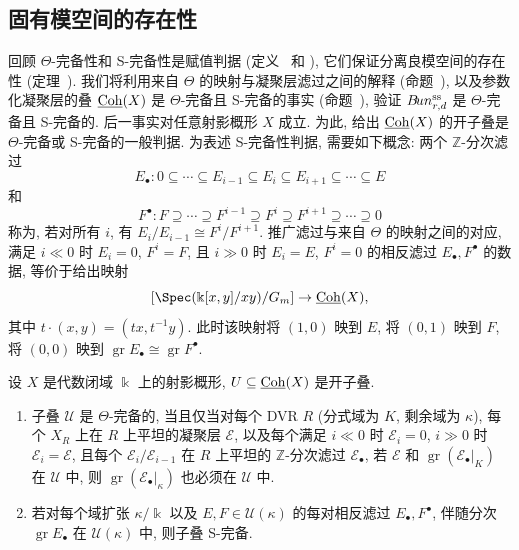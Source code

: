 \subsection{固有模空间的存在性}\label{src:9.3.2-subsection}
回顾 $\Theta$-完备性和 S-完备性是赋值判据 (定义~ 和 ), 它们保证分离良模空间的存在性 (定理~). 我们将利用来自 $\Theta$ 的映射与凝聚层滤过之间的解释 (命题~), 以及参数化凝聚层的叠 $\underline{\mathrm{Coh}}(X)$ 是 $\Theta$-完备且 S-完备的事实 (命题~), 验证 $B\!un_{r,d}^{\mathrm{ss}}$ 是 $\Theta$-完备且 S-完备的. 后一事实对任意射影概形 $X$ 成立. 为此, 给出 $\underline{\mathrm{Coh}}(X)$ 的开子叠是 $\Theta$-完备或 S-完备的一般判据. 为表述 S-完备性判据, 需要如下概念: 两个 $\mathbb Z$-分次滤过
\[
E_\bullet:0\subseteq\cdots\subseteq E_{i-1}\subseteq E_i\subseteq E_{i+1}\subseteq\cdots\subseteq E
\]
和
\[
F^\bullet:F\supseteq\cdots\supseteq F^{i-1}\supseteq F^i\supseteq F^{i+1}\supseteq\cdots\supseteq0
\]
称为, 若对所有 $i$, 有 $E_i/E_{i-1}\cong F^i/F^{i+1}$. 推广滤过与来自 $\Theta$ 的映射之间的对应, 满足 $i\ll0$ 时 $E_i=0$, $F^i=F$, 且 $i\gg0$ 时 $E_i=E$, $F^i=0$ 的相反滤过 $E_\bullet,F^\bullet$ 的数据, 等价于给出映射
\[
[\Spec(\Bbbk[x,y]/xy)/\mathbb G_m]\to\Coh(X),
\]
其中 $t\cdot(x,y)=(tx,t^{-1}y)$. 此时该映射将 $(1,0)$ 映到 $E$, 将 $(0,1)$ 映到 $F$, 将 $(0,0)$ 映到 $\operatorname{gr}E_\bullet\cong\operatorname{gr}F^\bullet$.
\begin{proposition}\label{src:9.3.6}
设 $X$ 是代数闭域 $\Bbbk$ 上的射影概形, $U\subseteq\underline{\mathrm{Coh}}(X)$ 是开子叠.
\begin{enumerate}[(1)]
\item 子叠 $\mathcal U$ 是 $\Theta$-完备的, 当且仅当对每个 DVR $R$ (分式域为 $K$, 剩余域为 $\kappa$), 每个 $X_R$ 上在 $R$ 上平坦的凝聚层 $\mathcal E$, 以及每个满足 $i\ll0$ 时 $\mathcal E_i=0$, $i\gg0$ 时 $\mathcal E_i=\mathcal E$, 且每个 $\mathcal E_i/\mathcal E_{i-1}$ 在 $R$ 上平坦的 $\mathbb Z$-分次滤过 $\mathcal E_\bullet$, 若 $\mathcal E$ 和 $\operatorname{gr}(\mathcal E_\bullet|_K)$ 在 $\mathcal U$ 中, 则 $\operatorname{gr}(\mathcal E_\bullet|_\kappa)$ 也必须在 $\mathcal U$ 中.
\item 若对每个域扩张 $\kappa/\Bbbk$ 以及 $E,F\in\mathcal U(\kappa)$ 的每对相反滤过 $E_\bullet,F^\bullet$, 伴随分次 $\operatorname{gr}E_\bullet$ 在 $\mathcal U(\kappa)$ 中, 则子叠 S-完备.
\end{enumerate}
\end{proposition}
